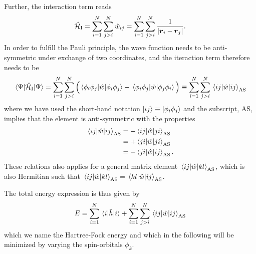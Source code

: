 Further, the interaction term reads
\begin{equation}
\hat{\mathcal{H}}_{\text{I}}=\sum_{i=1}^N\sum_{j>i}^N\hat{w}_{ij}=\sum_{i=1}^N\sum_{j>i}^N\frac{1}{|\boldsymbol{{r}}_i-\boldsymbol{{r}}_j|}.
\end{equation}
In order to fulfill the Pauli principle, the wave function needs to be anti-symmetric under exchange of two coordinates, and the iteraction term therefore needs to be
\begin{eqnarray}
\mel{\Psi}{\hat{\mathcal{H}}_{\text{I}}}{\Psi}=\sum_{i=1}^N\sum_{j>i}^N\Big(\mel{\phi_i\phi_j}{\hat{w}}{\phi_i\phi_j}-\mel{\phi_i\phi_j}{\hat{w}}{\phi_j\phi_i}\Big)\equiv\sum_{i=1}^N\sum_{j>i}^N\mel{ij}{\hat{w}}{ij}_{\text{AS}}
\end{eqnarray}
where we have used the short-hand notation $\ket{ij}\equiv\ket{\phi_i\phi_j}$ and the subscript, AS, implies that the element is anti-symmetric with the properties
\begin{equation}
\begin{aligned}
\mel{ij}{\hat{w}}{ij}_{\text{AS}}&=-\mel{ij}{\hat{w}}{ji}_{\text{AS}}\\
&=+\mel{ji}{\hat{w}}{ji}_{\text{AS}}\\
&=-\mel{ji}{\hat{w}}{ij}_{\text{AS}}.
\end{aligned}
\end{equation}
These relations also applies for a general matrix element $\mel{ij}{\hat{w}}{kl}_{\text{AS}}$, which is also Hermitian such that $\mel{ij}{\hat{w}}{kl}_{\text{AS}}=\mel{kl}{\hat{w}}{ij}_{\text{AS}}$.

The total energy expression is thus given by
\begin{eqnarray}
E=\sum_{i=1}^N\mel{i}{\hat{h}}{i}+\sum_{i=1}^N\sum_{j>i}^N\mel{ij}{\hat{w}}{ij}_{\text{AS}}
\end{eqnarray}
which we name the Hartree-Fock energy and which in the following will be minimized by varying the spin-orbitals $\phi_k$.


